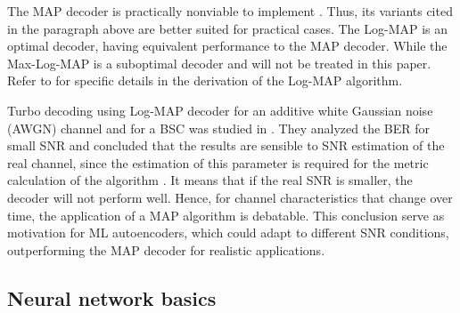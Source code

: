 \documentclass[conference]{IEEEtran}
\begin{document}
The MAP decoder is practically nonviable to implement \cite{b6}. Thus, its variants cited in the paragraph above are better suited for practical cases. The Log-MAP is an optimal decoder, having equivalent performance to the MAP decoder. While the Max-Log-MAP is a suboptimal decoder and will not be treated in this paper. Refer to \cite{b6} for specific details in the derivation of the Log-MAP algorithm.

Turbo decoding using Log-MAP decoder for an additive white Gaussian noise (AWGN) channel and for a BSC was studied in \cite{b5}. They analyzed the BER for small SNR and concluded that the results are sensible to SNR estimation of the real channel, since the estimation of this parameter is required for the metric calculation of the algorithm \cite{b6}. It means that if the real SNR is smaller, the decoder will not perform well. Hence, for channel characteristics that change over time, the application of a MAP algorithm is debatable. This conclusion serve as motivation for ML autoencoders, which could adapt to different SNR conditions, outperforming the MAP decoder for realistic applications.

\subsection{Neural network basics}

\end{document}
